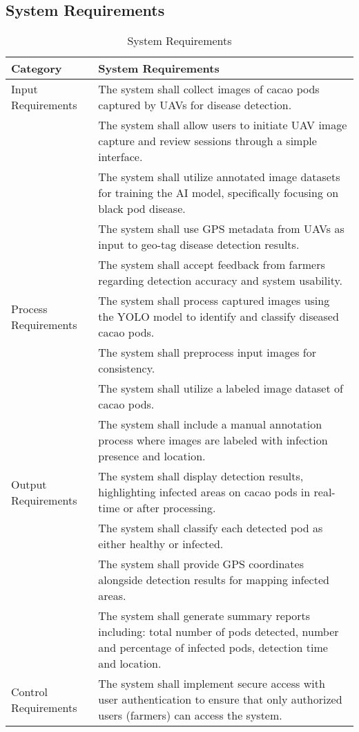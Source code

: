 	\subsection{System Requirements}
	
	\begin{table}[h!]
		\centering
		\caption{System Requirements}
		\label{tab:sysreq}
		\begin{tabular}{ll}
			\toprule
			\textbf{Category} & \textbf{System Requirements} \\ 
			\midrule
			Input Requirements & The system shall collect images of cacao pods captured by UAVs for disease detection. \\
			 & The system shall allow users to initiate UAV image capture and review sessions through a simple interface. \\
			 & The system shall utilize annotated image datasets for training the AI model, specifically focusing on black pod disease. \\
			 & The system shall use GPS metadata from UAVs as input to geo-tag disease detection results. \\
			 & The system shall accept feedback from farmers regarding detection accuracy and system usability. \\
			\midrule
			Process Requirements & The system shall process captured images using the YOLO model to identify and classify diseased cacao pods. \\
			 & The system shall preprocess input images for consistency. \\
			 & The system shall utilize a labeled image dataset of cacao pods. \\
			 & The system shall include a manual annotation process where images are labeled with infection presence and location. \\
			\midrule
			Output Requirements & The system shall display detection results, highlighting infected areas on cacao pods in real-time or after processing. \\
			  & The system shall classify each detected pod as either healthy or infected. \\
			  & The system shall provide GPS coordinates alongside detection results for mapping infected areas. \\
			  & The system shall generate summary reports including: total number of pods detected, number and percentage of infected pods, detection time and location.\\
			\midrule
			Control Requirements & The system shall implement secure access with user authentication to ensure that only authorized users (farmers) can access the system. \\

\end{tabular}
\end{table}
